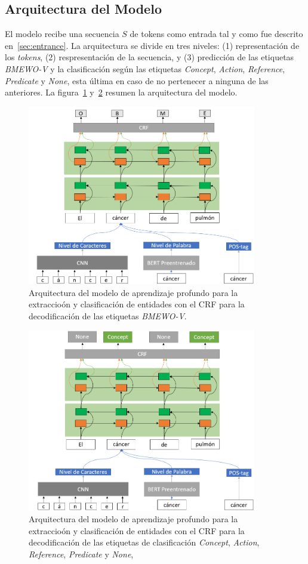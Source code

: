 \subsection{Arquitectura del Modelo}

El modelo recibe una secuencia $S$ de tokens como entrada tal y como fue descrito en~\ref{sec:entrance}. La arquitectura se divide en tres niveles: (1) representaci\'on de los \emph{tokens}, (2) respresentaci\'on de la secuencia, y (3) predicci\'on de las etiquetas \emph{BMEWO-V} y la clasificaci\'on seg\'un las etiquetas \emph{Concept}, \emph{Action}, \emph{Reference}, \emph{Predicate} y \emph{None}, esta \'ultima en caso de no pertenecer a ninguna de las anteriores. La figura~\ref{fig:ArcModRec} y~\ref{fig:ArcModClass} resumen la arquitectura del modelo.


\begin{figure}[h!]
	\centering
	\includegraphics[width = 10cm]{Graphics/EntitiesModelRec.png}
	\caption{Arquitectura del modelo de aprendizaje profundo para la extraccio\'on y clasificaci\'on de entidades con el CRF para la decodificaci\'on de las etiquetas \emph{BMEWO-V}.}\label{fig:ArcModRec}
\end{figure}

\begin{figure}[h!]
	\centering
	\includegraphics[width = 10cm]{Graphics/EntitiesModelClas.png}
	\caption{Arquitectura del modelo de aprendizaje profundo para la extraccio\'on y clasificaci\'on de entidades con el CRF para la decodificaci\'on de las etiquetas de clasificaci\'on \emph{Concept}, \emph{Action}, \emph{Reference}, \emph{Predicate} y \emph{None},}\label{fig:ArcModClass}
\end{figure}

